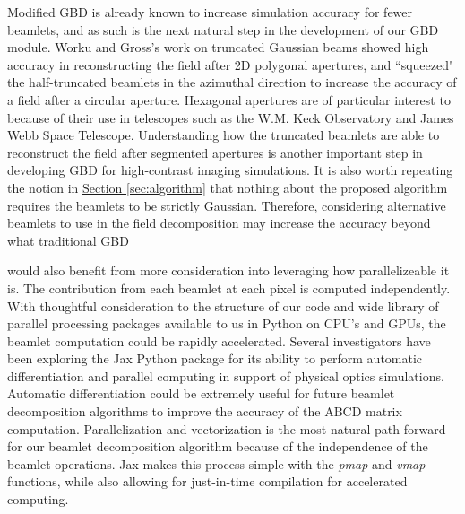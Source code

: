 Modified GBD is already known to increase simulation accuracy for fewer beamlets\cite{Worku19}, and as such is the next natural step in the development of our GBD module. Worku and Gross's work on truncated Gaussian beams showed high accuracy in reconstructing the field after 2D polygonal apertures, and ``squeezed" the half-truncated beamlets in the azimuthal direction to increase the accuracy of a field after a circular aperture. Hexagonal apertures are of particular interest to  because of their use in telescopes such as the W.M. Keck Observatory and James Webb Space Telescope. Understanding how the truncated beamlets are able to reconstruct the field after segmented apertures is another important step in developing GBD for high-contrast imaging simulations. It is also worth repeating the notion in \hyperref[sec:algorithm]{Section \ref{sec:algorithm}} that nothing about the proposed algorithm requires the beamlets to be strictly Gaussian. Therefore, considering alternative beamlets to use in the field decomposition may increase the accuracy beyond what traditional GBD 

 would also benefit from more consideration into leveraging how parallelizeable it is. The contribution from each beamlet at each pixel is computed independently. With thoughtful consideration to the structure of our code and wide library of parallel processing packages available to us in Python on CPU's and GPUs\cite{lam_numba_2015,robert_mcleod_2018_2483274}, the beamlet computation could be rapidly accelerated.  Several investigators have been exploring the Jax Python package for its ability to perform automatic differentiation and parallel computing in support of physical optics simulations\cite{Desdoigts2022,Wong21,Pope21}. Automatic differentiation could be extremely useful for future beamlet decomposition algorithms to improve the accuracy of the ABCD matrix computation. Parallelization and vectorization is the most natural path forward for our beamlet decomposition algorithm because of the independence of the beamlet operations. Jax makes this process simple with the \emph{pmap} and \emph{vmap} functions, while also allowing for just-in-time compilation for accelerated computing. 

